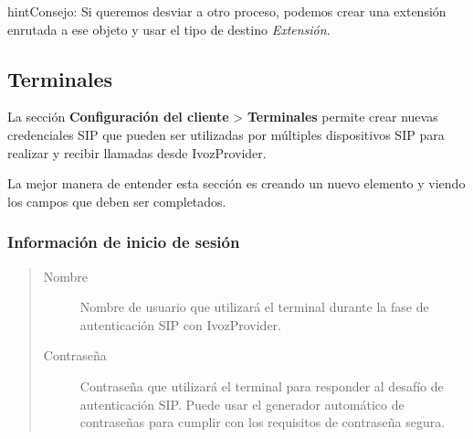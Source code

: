 \documentclass[letterpaper,10pt,spanish]{sphinxmanual}
\begin{document}
\begin{notice}{hint}{Consejo:}
Si queremos desviar a otro proceso, podemos crear una extensión enrutada a ese objeto y usar el tipo de destino \emph{Extensión}.
\end{notice}


\subsection{Terminales}
\label{administration_portal/client/vpbx/terminals:terminals}\label{administration_portal/client/vpbx/terminals::doc}\label{administration_portal/client/vpbx/terminals:id1}
La sección \textbf{Configuración del cliente} \textgreater{} \textbf{Terminales} permite crear nuevas credenciales SIP que pueden ser utilizadas por múltiples dispositivos SIP para realizar y recibir llamadas desde IvozProvider.

La mejor manera de entender esta sección es creando un nuevo elemento y viendo los campos que deben ser completados.


\subsubsection{Información de inicio de sesión}
\label{administration_portal/client/vpbx/terminals:login-information}\begin{quote}
\begin{description}
\item[{Nombre}] \leavevmode
Nombre de usuario que utilizará el terminal durante la fase de autenticación SIP con IvozProvider.

\item[{Contraseña}] \leavevmode
Contraseña que utilizará el terminal para responder al desafío de autenticación SIP. Puede usar el generador automático de contraseñas para cumplir con los requisitos de contraseña segura.

\end{description}
\end{quote}
\end{document}
